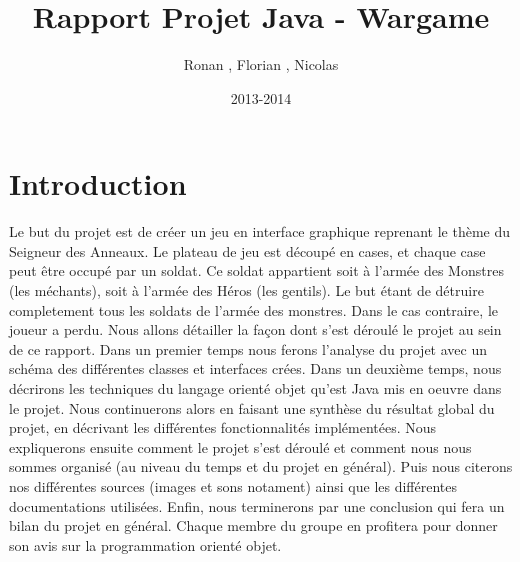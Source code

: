 \documentclass{report}
\title{Rapport Projet Java - Wargame}
\author{Ronan \bsc{Abhamon}, Florian \bsc{Bigard}, Nicolas \bsc{Reynaud}}
\date{2013-2014}
\begin{document}
\maketitle
\renewcommand{\contentsname}{Sommaire}
\tableofcontents
\newpage


\section{Introduction}
Le but du projet est de créer un jeu en interface graphique reprenant le thème du Seigneur des Anneaux. 
Le plateau de jeu est découpé en cases, et chaque case peut être occupé par un soldat. 
Ce soldat appartient soit à l'armée des Monstres (les méchants), soit à l'armée des Héros (les gentils).
Le but étant de détruire completement tous les soldats de l'armée des monstres. Dans le cas contraire, le joueur a perdu.
Nous allons détailler la façon dont s'est déroulé le projet au sein de ce rapport.
Dans un premier temps nous ferons l'analyse du projet avec un schéma des différentes classes et interfaces crées.
Dans un deuxième temps, nous décrirons les techniques du langage orienté objet qu'est Java mis en oeuvre dans le projet.
Nous continuerons alors en faisant une synthèse du résultat global du projet, en décrivant les différentes fonctionnalités implémentées.
Nous expliquerons ensuite comment le projet s'est déroulé et comment nous nous sommes organisé (au niveau du temps et du projet en général).
Puis nous citerons nos différentes sources (images et sons notament) ainsi que les différentes documentations utilisées.
Enfin, nous terminerons par une conclusion qui fera un bilan du projet en général. 
Chaque membre du groupe en profitera pour donner son avis sur la programmation orienté objet.
\end{document}
